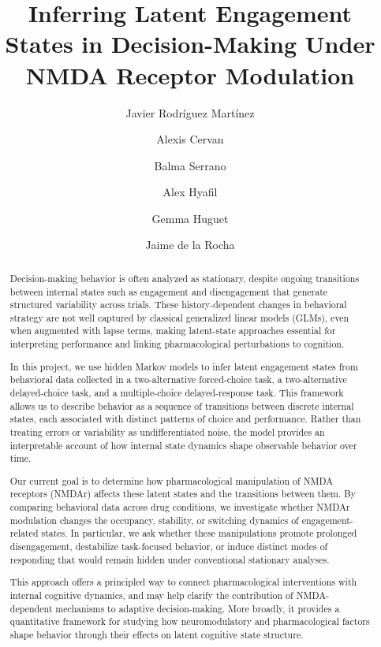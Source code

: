 \documentclass[11pt]{article}
\title{Inferring Latent Engagement States in Decision-Making Under NMDA Receptor Modulation}
\author[1]{Javier Rodr\'iguez Mart\'inez}
\author[1]{Alexis Cervan}
\author[1]{Balma Serrano}
\author[2]{Alex Hyafil}
\author[2,3]{Gemma Huguet}
\author[1]{Jaime de la Rocha}
\affil[1]{Institut d'Investigacions Biom\`ediques August Pi i Sunyer (IDIBAPS)}
\affil[2]{Centre de Recerca Matem\`atica}
\affil[3]{Universitat Politècnica de Catalunya}
\date{}
\begin{document}
\maketitle

\begin{abstract}
Decision-making behavior is often analyzed as stationary, despite ongoing transitions between internal states such as engagement and disengagement that generate structured variability across trials. These history-dependent changes in behavioral strategy are not well captured by classical generalized linear models (GLMs), even when augmented with lapse terms, making latent-state approaches essential for interpreting performance and linking pharmacological perturbations to cognition.

In this project, we use hidden Markov models to infer latent engagement states from behavioral data collected in a two-alternative forced-choice task, a two-alternative delayed-choice task, and a multiple-choice delayed-response task. This framework allows us to describe behavior as a sequence of transitions between discrete internal states, each associated with distinct patterns of choice and performance. Rather than treating errors or variability as undifferentiated noise, the model provides an interpretable account of how internal state dynamics shape observable behavior over time.

Our current goal is to determine how pharmacological manipulation of NMDA receptors (NMDAr) affects these latent states and the transitions between them. By comparing behavioral data across drug conditions, we investigate whether NMDAr modulation changes the occupancy, stability, or switching dynamics of engagement-related states. In particular, we ask whether these manipulations promote prolonged disengagement, destabilize task-focused behavior, or induce distinct modes of responding that would remain hidden under conventional stationary analyses.

This approach offers a principled way to connect pharmacological interventions with internal cognitive dynamics, and may help clarify the contribution of NMDA-dependent mechanisms to adaptive decision-making. More broadly, it provides a quantitative framework for studying how neuromodulatory and pharmacological factors shape behavior through their effects on latent cognitive state structure.
\end{abstract}
\end{document}
